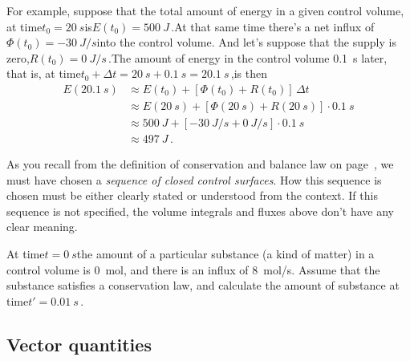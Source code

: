 \documentclass[a4paper,12pt,%
onecolumn,oneside,titlepage,%
british%
]{memoir}
\newcommand*{\incr}{\Delta}%
\renewcommand*{\|}[1][]{\nonscript\:#1\vert\nonscript\:\mathopen{}}
\newcommand*{\yE}{E}
\newcommand*{\yH}{\varPhi}%
\newcommand*{\yR}{R}%
\newcommand*{\Dt}{\incr t}
\begin{document}
For example, suppose that the total amount of energy in a given control volume, at time\enspace$t_{0}=\qty{20}{s}$\enspace is\enspace$\yE(t_{0})=\qty{500}{J}$\,.\enspace At that same time there's a net influx of\enspace$\yH(t_{0})= \qty{-30}{J/s}$\enspace into the control volume. And let's suppose that the supply is zero,\enspace$\yR(t_{0})=\qty{0}{J/s}$\,.\enspace The amount of energy in the control volume \qty{0.1}{s} later, that is, at time\enspace$t_{0}+\Dt = \qty{20}{s} + \qty{0.1}{s} = \qty{20.1}{s}$\,,\enspace is then
\begin{equation*}
  \begin{split}
    \yE(\qty{20.1}{s}) &\approx \yE(t_{0}) + [\yH(t_{0}) + \yR(t_{0})]\,\Dt
    \\
    &\approx \yE(\qty{20}{s}) + [\yH(\qty{20}{s}) + \yR(\qty{20}{s})]\cdot\qty{0.1}{s}
    \\
    &\approx \qty{500}{J} + [\qty{-30}{J/s} + \qty{0}{J/s}]\cdot\qty{0.1}{s}
    \\
    &\approx \qty{497}{J} \,.
  \end{split}
\end{equation*}

\begin{warning}
As you recall from the definition of conservation and balance law on page~\pageref{eq:conserved}, we must have chosen a \emph{sequence of closed control surfaces}. How this sequence is chosen must be either clearly stated or understood from the context. If this sequence is not specified, the volume integrals and fluxes above don't have any clear meaning.
\end{warning}

\begin{exercise}
  At time\enspace$t=\qty{0}{s}$\enspace the amount of a particular substance (a kind of matter) in a control volume is \qty{0}{mol}, and there is an influx of \qty{8}{mol/s}. Assume that the substance satisfies a conservation law, and calculate the amount of substance at time\enspace$t'=\qty{0.01}{s}$\,.
\end{exercise}






\subsection{Vector quantities}
\label{sec:timestep_vector}
\end{document}
